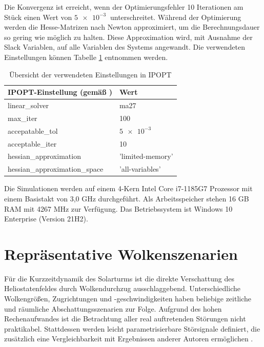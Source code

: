 Die Konvergenz ist erreicht, wenn der Optimierungsfehler 10 Iterationen am Stück einen Wert von $\SI{5e-3}{}$ unterschreitet.
Während der Optimierung werden die Hesse-Matrizen nach Newton approximiert, um die Berechnungsdauer so gering wie möglich zu halten.
Diese Approximation wird, mit Ausnahme der Slack Variablen, auf alle Variablen des Systems angewandt.
Die verwendeten Einstellungen können Tabelle \ref{tab_IPOPT} entnommen werden.

\begingroup
\renewcommand{\arraystretch}{1.2}
\begin{table}[ht!]
    \caption[Übersicht der verwendeten Einstellungen in IPOPT]{Übersicht der verwendeten Einstellungen in IPOPT}
    \centering
    \begin{tabular}{m{}m{}}
        \rowcolor{white}
        \toprule
        IPOPT-Einstellung (gemäß \cite{IPOPT}) & Wert             \\
        \midrule
        linear_solver                          & ma27             \\
        max_iter                               & 100              \\
        accepatable_tol                        & $\SI{5e-3}{}$    \\
        acceptable_iter                        & 10               \\
        hessian_approximation                  & 'limited-memory' \\
        hessian_approximation_space            & 'all-variables'  \\
        \toprule
    \end{tabular}
    \label{tab_IPOPT}
\end{table}
\endgroup

Die Simulationen werden auf einem 4-Kern Intel Core i7-1185G7 Prozessor mit einem Basistakt von 3,0 GHz durchgeführt.
Als Arbeitsspeicher stehen 16 GB RAM mit 4267 MHz zur Verfügung.
Das Betriebssystem ist Windows 10 Enterprise (Version 21H2).


\section{Repräsentative Wolkenszenarien} \label{sec_reprWolkenszenarien}
Für die Kurzzeitdynamik des Solarturms ist die direkte Verschattung des Heliostatenfeldes durch Wolkendurchzug ausschlaggebend.
Unterschiedliche Wolkengrößen, Zugrichtungen und -geschwindigkeiten haben beliebige zeitliche und räumliche Abschattungsszenarien zur Folge.
Aufgrund des hohen Rechenaufwandes ist die Betrachtung aller real auftretenden Störungen nicht praktikabel.
Stattdessen werden leicht parametrisierbare Störsignale definiert, die zusätzlich eine Vergleichbarkeit mit Ergebnissen anderer Autoren ermöglichen \cite[S.60]{DissHirsch}.

